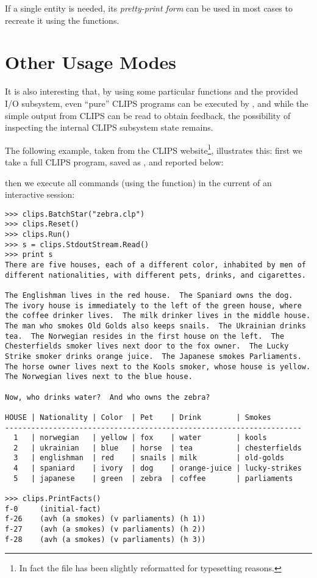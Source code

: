 If a single entity is needed, its \emph{pretty-print form} can be used
in most cases to recreate it using the  functions.


\section{Other Usage Modes\label{pyclips-ov-otheruses}}

It is also interesting that, by using some particular functions and the
provided I/O subsystem, even ``pure'' CLIPS programs can be executed by
\pyclips{}, and while the simple output from CLIPS can be read to obtain
feedback, the possibility of inspecting the internal CLIPS subsystem
state remains.

The following example, taken from the CLIPS website\footnote{In fact
the file has been slightly reformatted for typesetting reasons.},
illustrates this: first we take a full CLIPS program, saved as
, and reported below:


then we execute all commands (using the  function)
in the current  of an interactive \pyclips{} session:

\begin{verbatim}
>>> clips.BatchStar("zebra.clp")
>>> clips.Reset()
>>> clips.Run()
>>> s = clips.StdoutStream.Read()
>>> print s
There are five houses, each of a different color, inhabited by men of
different nationalities, with different pets, drinks, and cigarettes.

The Englishman lives in the red house.  The Spaniard owns the dog.
The ivory house is immediately to the left of the green house, where
the coffee drinker lives.  The milk drinker lives in the middle house.
The man who smokes Old Golds also keeps snails.  The Ukrainian drinks
tea.  The Norwegian resides in the first house on the left.  The
Chesterfields smoker lives next door to the fox owner.  The Lucky
Strike smoker drinks orange juice.  The Japanese smokes Parliaments.
The horse owner lives next to the Kools smoker, whose house is yellow.
The Norwegian lives next to the blue house.

Now, who drinks water?  And who owns the zebra?

HOUSE | Nationality | Color  | Pet    | Drink        | Smokes
--------------------------------------------------------------------
  1   | norwegian   | yellow | fox    | water        | kools
  2   | ukrainian   | blue   | horse  | tea          | chesterfields
  3   | englishman  | red    | snails | milk         | old-golds
  4   | spaniard    | ivory  | dog    | orange-juice | lucky-strikes
  5   | japanese    | green  | zebra  | coffee       | parliaments

>>> clips.PrintFacts()
f-0     (initial-fact)
f-26    (avh (a smokes) (v parliaments) (h 1))
f-27    (avh (a smokes) (v parliaments) (h 2))
f-28    (avh (a smokes) (v parliaments) (h 3))
\end{verbatim}

